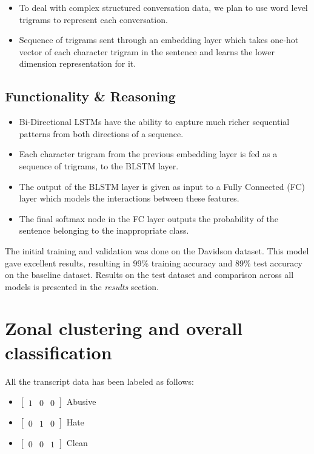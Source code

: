 \documentclass{article}[A4]
\begin{document}
\begin{itemize}
	\item{To deal with complex structured conversation data, we plan to use word level trigrams to represent each conversation.}
	\item{Sequence of trigrams sent through an embedding layer which takes one-hot vector of each character trigram in the sentence and learns the lower dimension representation for it.}
\end{itemize}

\subsection{Functionality \& Reasoning}

\begin{itemize}
	\item{Bi-Directional LSTMs have the ability to capture much richer sequential patterns from both directions of a sequence.}
	\item{Each character trigram from the previous embedding layer is fed as a sequence of trigrams, to the BLSTM layer.}
	\item{The output of the BLSTM layer is given as input to a Fully Connected (FC) layer which models the interactions between these features.}
	\item{The final softmax node in the FC layer outputs the probability of the sentence belonging to the inappropriate class.}
\end{itemize}



The initial training and validation was done on the Davidson dataset. This model gave excellent results, resulting in 99\% training accuracy and 89\% test accuracy on the baseline dataset. Results on the test dataset and comparison across all models is presented in the \textit{results} section.
\pagebreak[4]
\section{Zonal clustering and overall classification}

All the transcript data has been labeled as follows:
\begin{itemize}
\item {$\begin{bmatrix}1 & 0 & 0\end{bmatrix}$ Abusive}
\item {$\begin{bmatrix}0 & 1 & 0\end{bmatrix}$ Hate}
\item {$\begin{bmatrix}0 & 0 & 1\end{bmatrix}$ Clean}
\end{itemize}
\end{document}
